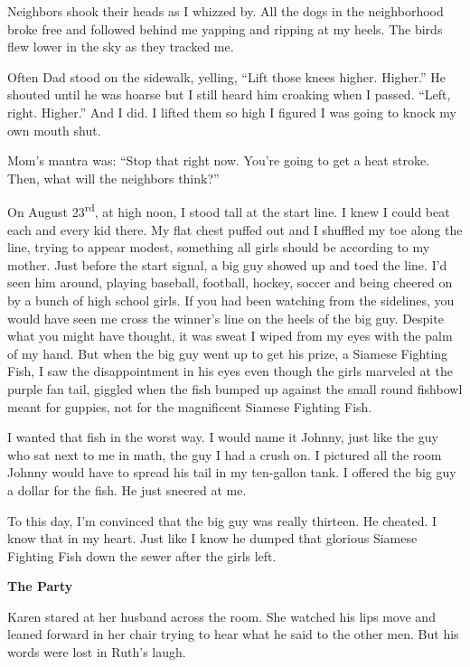 \documentclass[
]{article}
\begin{document}
Neighbors shook their heads as I whizzed by. All the dogs in the
neighborhood broke free and followed behind me yapping and ripping at my
heels. The birds flew lower in the sky as they tracked me.

Often Dad stood on the sidewalk, yelling, ``Lift those knees higher.
Higher.'' He shouted until he was hoarse but I still heard him croaking
when I passed. ``Left, right. Higher.'' And I did. I lifted them so high
I figured I was going to knock my own mouth shut.

Mom's mantra was: ``Stop that right now. You're going to get a heat
stroke. Then, what will the neighbors think?''

On August 23\textsuperscript{rd}, at high noon, I stood tall at the
start line. I knew I could beat each and every kid there. My flat chest
puffed out and I shuffled my toe along the line, trying to appear
modest, some­thing all girls should be according to my mother. Just
before the start signal, a big guy showed up and toed the line. I'd seen
him around, playing baseball, football, hockey, soccer and being cheered
on by a bunch of high school girls. If you had been watching from the
sidelines, you would have seen me cross the winner's line on the heels
of the big guy. Despite what you might have thought, it was sweat I
wiped from my eyes with the palm of my hand. But when the big guy went
up to get his prize, a Siamese Fighting Fish, I saw the disappointment
in his eyes even though the girls marveled at the pur­ple fan tail,
giggled when the fish bumped up against the small round fishbowl meant
for guppies, not for the magnificent Siamese Fighting Fish.

I wanted that fish in the worst way. I would name it Johnny, just like
the guy who sat next to me in math, the guy I had a crush on. I pictured
all the room Johnny would have to spread his tail in my ten-gallon tank.
I offered the big guy a dollar for the fish. He just sneered at me.

To this day, I'm convinced that the big guy was really thirteen. He
cheated. I know that in my heart. Just like I know he dumped that
glorious Siamese Fighting Fish down the sewer after the girls left.

\textbf{\hfill\break
}

\textbf{The Party}

Karen stared at her husband across the room. She watched his lips move
and leaned forward in her chair trying to hear what he said to the other
men. But his words were lost in Ruth's laugh.
\end{document}
